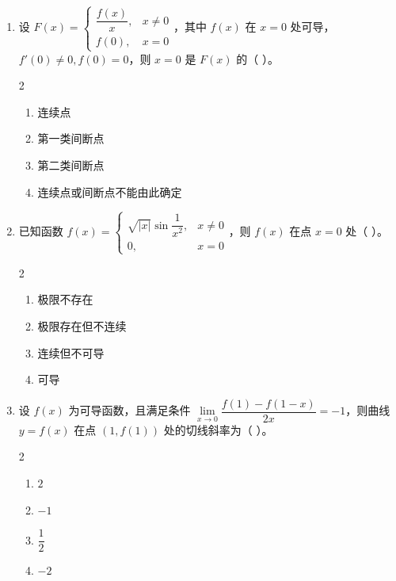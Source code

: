 \begin{enumerate}[label=\textbf{\arabic*.}, itemsep=4.7cm]
    \item 设 $F(x) = \begin{cases} \dfrac{f(x)}{x}, & x \neq 0 \\ f(0), & x = 0 \end{cases}$，其中 $f(x)$ 在 $x=0$ 处可导，$f'(0) \neq 0, f(0) = 0$，则 $x=0$ 是 $F(x)$ 的（ \quad ）。
    \begin{multicols}{2}
        \begin{enumerate}[label=(\Alph*)]
            \item 连续点
            \item 第一类间断点
            \item 第二类间断点
            \item 连续点或间断点不能由此确定
        \end{enumerate}
    \end{multicols}

    \item 已知函数 $f(x) = \begin{cases} \sqrt{|x|} \sin \dfrac{1}{x^2}, & x \neq 0 \\ 0, & x = 0 \end{cases}$，则 $f(x)$ 在点 $x=0$ 处（ \quad ）。
    \begin{multicols}{2}
        \begin{enumerate}[label=(\Alph*)]
            \item 极限不存在
            \item 极限存在但不连续
            \item 连续但不可导
            \item 可导
        \end{enumerate}
    \end{multicols}

    \item 设 $f(x)$ 为可导函数，且满足条件 $\lim\limits_{x \to 0} \dfrac{f(1) - f(1-x)}{2x} = -1$，则曲线 $y=f(x)$ 在点 $(1, f(1))$ 处的切线斜率为（ \quad ）。
    \begin{multicols}{2}
        \begin{enumerate}[label=(\Alph*)]
            \item $2$
            \item $-1$
            \item $\dfrac{1}{2}$
            \item $-2$
        \end{enumerate}
    \end{multicols}


\end{enumerate}
